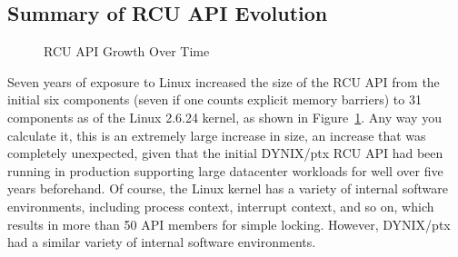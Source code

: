 \subsection{Summary of RCU API Evolution}
\label{sec:app:rcuhist:Summary of RCU API Evolution}

\begin{figure}[tb]
\begin{center}
\end{center}
\caption{RCU API Growth Over Time}
\label{fig:app:rcuhist:RCU API Growth Over Time}
\end{figure}

Seven years of exposure to Linux increased the size of the RCU API from
the initial six components (seven if one counts explicit memory barriers)
to 31 components as of the Linux 2.6.24 kernel, as shown in
Figure~\ref{fig:app:rcuhist:RCU API Growth Over Time}.
Any way you calculate it, this is an extremely large increase in size,
an increase that was completely unexpected, given that the initial
DYNIX/ptx RCU API had been running in production supporting large datacenter
workloads for well over five years beforehand.
Of course, the Linux kernel has a variety of internal software environments,
including process context, interrupt context, and so on, which results
in more than 50 API members for simple locking.
However, DYNIX/ptx had a similar variety of internal software environments.

